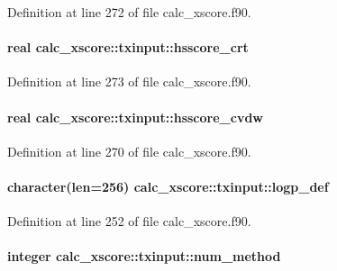Definition at line 272 of file calc\-\_\-xscore.\-f90.

\hypertarget{structcalc__xscore_1_1txinput_a5e1c85d834d137f1f73b6eea96382688}{
\paragraph[{hsscore\-\_\-crt}]{\setlength{\rightskip}{0pt plus 5cm}real calc\-\_\-xscore\-::txinput\-::hsscore\-\_\-crt}}\label{structcalc__xscore_1_1txinput_a5e1c85d834d137f1f73b6eea96382688}


Definition at line 273 of file calc\-\_\-xscore.\-f90.

\hypertarget{structcalc__xscore_1_1txinput_a4459d93ee067a68d028cd230310cd902}{
\paragraph[{hsscore\-\_\-cvdw}]{\setlength{\rightskip}{0pt plus 5cm}real calc\-\_\-xscore\-::txinput\-::hsscore\-\_\-cvdw}}\label{structcalc__xscore_1_1txinput_a4459d93ee067a68d028cd230310cd902}


Definition at line 270 of file calc\-\_\-xscore.\-f90.

\hypertarget{structcalc__xscore_1_1txinput_a4c275d7efa9ff41a10c571826e9b3439}{
\paragraph[{logp\-\_\-def}]{\setlength{\rightskip}{0pt plus 5cm}character(len=256) calc\-\_\-xscore\-::txinput\-::logp\-\_\-def}}\label{structcalc__xscore_1_1txinput_a4c275d7efa9ff41a10c571826e9b3439}


Definition at line 252 of file calc\-\_\-xscore.\-f90.

\hypertarget{structcalc__xscore_1_1txinput_a8455fab659a620b94f946b6c9524de13}{
\paragraph[{num\-\_\-method}]{\setlength{\rightskip}{0pt plus 5cm}integer calc\-\_\-xscore\-::txinput\-::num\-\_\-method}}\label{structcalc__xscore_1_1txinput_a8455fab659a620b94f946b6c9524de13}


